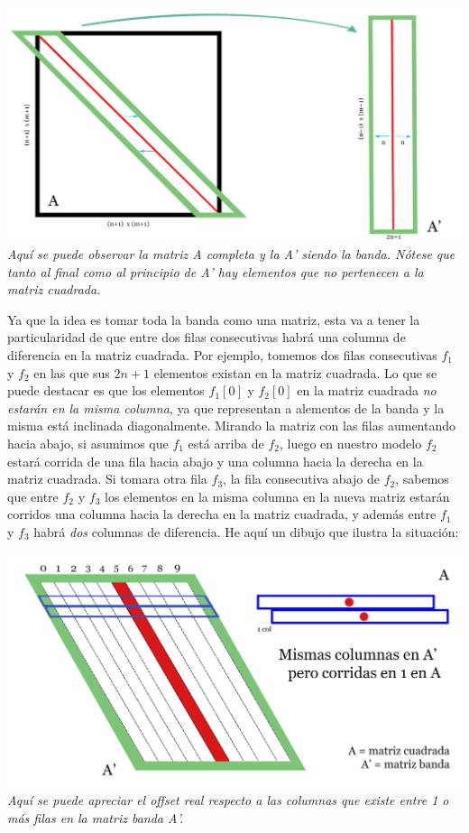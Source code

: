 	\begin{center}
		\includegraphics[scale=1]{./img/matriz_A_idea.png}
		\vspace{1pt}
		\footnotesize\textit{Aquí se puede observar la matriz A completa y la A' siendo la banda. Nótese que tanto al final como al principio de A' hay elementos que no pertenecen a la matriz cuadrada.}
	\end{center}
	
	
Ya que la idea es tomar toda la banda como una matriz, esta va a tener la particularidad de que entre dos filas consecutivas habrá una columna de diferencia en la matriz cuadrada. Por ejemplo, tomemos dos filas consecutivas $f_1$ y $f_2$ en las que sus $2n+1$ elementos existan en la matriz cuadrada. Lo que se puede destacar es que los elementos $f_1[0]$ y $f_2[0]$ en la matriz cuadrada \textit{no estarán en la misma columna}, ya que representan a alementos de la banda y la misma está inclinada diagonalmente. Mirando la matriz con las filas aumentando hacia abajo, si asumimos que $f_1$ está arriba de $f_2$, luego en nuestro modelo $f_2$ estará corrida de una fila hacia abajo y una columna hacia la derecha en la matriz cuadrada. Si tomara otra fila $f_3$, la fila consecutiva abajo de $f_2$, sabemos que entre $f_2$ y $f_3$ los elementos en la misma columna en la nueva matriz estarán corridos una columna hacia la derecha en la matriz cuadrada, y además entre $f_1$ y $f_3$ habrá \textit{dos} columnas de diferencia. He aquí un dibujo que ilustra la situación:


	\begin{center}
		\includegraphics[scale=1]{./img/matriz_A_offset.png}
		\vspace{1pt}
		\footnotesize\textit{Aquí se puede apreciar el offset real respecto a las columnas que existe entre 1 o más filas en la matriz banda A'.}
	\end{center}
	
